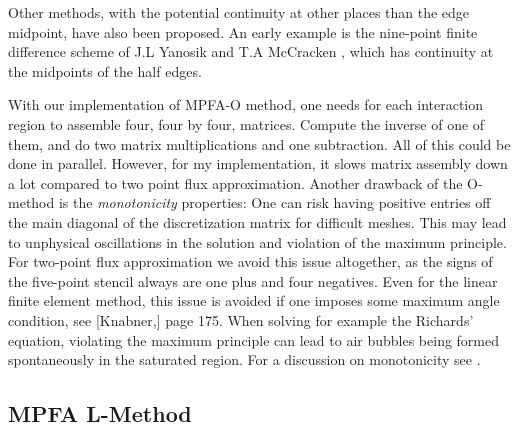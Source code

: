 \documentclass[../Main/main.tex]{subfiles}
\begin{document}
	Other methods, with the potential continuity at other places than the edge midpoint, have also been proposed. An early example is the nine-point finite difference scheme of J.L Yanosik and T.A McCracken \cite{10.2118/5734-PA}, which has continuity at the midpoints of the half edges.
	\par 
	With our implementation of MPFA-O method, one needs for each interaction region to assemble four, four by four, matrices. Compute the inverse of one of them, and do two matrix multiplications and one subtraction. All of this could be done in parallel. However, for my implementation, it slows matrix assembly down a lot compared to two point flux approximation. Another drawback of the O-method is the \emph{monotonicity} properties: One can risk having positive entries off the main diagonal of the discretization matrix for difficult meshes. This may lead to unphysical oscillations in the solution and violation of the maximum principle. For two-point flux approximation we avoid this issue altogether, as the signs of the five-point stencil always are one plus and four negatives. Even for the linear finite element method, this issue is avoided if one imposes some maximum angle condition, see [Knabner,\cite{Knabner}] page 175. When solving for example the Richards' equation, violating the maximum principle can lead to air bubbles being formed spontaneously in the saturated region. For a discussion on monotonicity see \cite{10.1007/s00211-006-0060-z}.
	\subsection{MPFA L-Method}
	\label{sec:L-method}
\end{document}
